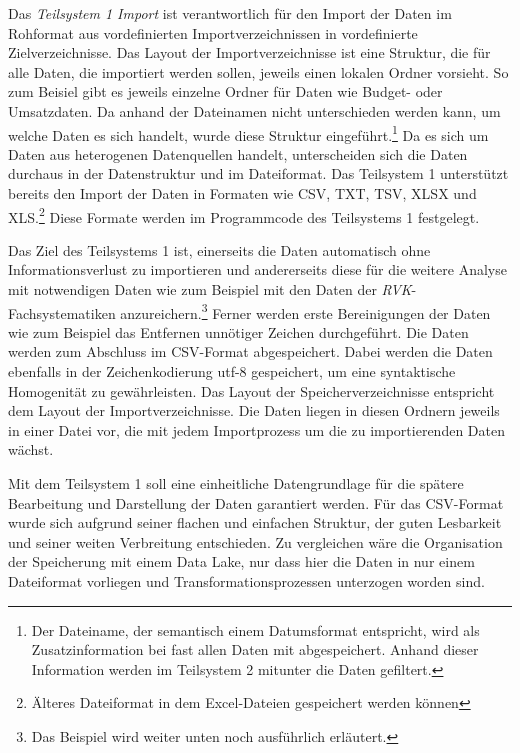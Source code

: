     Das \textit{Teilsystem 1 Import} ist verantwortlich für den Import der Daten im Rohformat aus vordefinierten Importverzeichnissen 
    in vordefinierte Zielverzeichnisse. Das Layout der Importverzeichnisse ist eine Struktur, die für alle Daten, die importiert werden sollen,
    jeweils einen lokalen Ordner vorsieht. So zum Beisiel gibt es jeweils einzelne Ordner für Daten wie Budget- oder Umsatzdaten.
    Da anhand der Dateinamen nicht unterschieden werden kann, um welche Daten es sich handelt, wurde diese Struktur eingeführt.\footnote{ Der Dateiname, der semantisch einem Datumsformat entspricht, wird als Zusatzinformation bei fast allen Daten mit abgespeichert.
    Anhand dieser Information werden im Teilsystem 2 mitunter die Daten gefiltert.} 
    Da es sich um Daten aus heterogenen Datenquellen handelt, unterscheiden sich die Daten durchaus in der Datenstruktur und im Dateiformat. 
    Das Teilsystem 1 unterstützt bereits den Import der Daten in Formaten wie CSV, TXT, TSV, XLSX und XLS.\footnote{ Älteres Dateiformat in dem Excel-Dateien gespeichert werden können} Diese Formate werden im Programmcode des Teilsystems 1 festgelegt.
    
    Das Ziel des Teilsystems 1 ist, einerseits die Daten automatisch ohne Informationsverlust zu importieren 
    und andererseits diese für die weitere Analyse mit notwendigen Daten wie zum Beispiel mit den Daten 
    der \textit{\acrshort{RVK}}-Fachsystematiken anzureichern.\footnote{ Das Beispiel wird weiter unten noch ausführlich erläutert.}
    Ferner werden erste Bereinigungen der Daten wie zum Beispiel das Entfernen unnötiger Zeichen durchgeführt. Die Daten werden zum Abschluss im CSV-Format abgespeichert. 
    Dabei werden die Daten ebenfalls in der Zeichenkodierung utf-8 gespeichert, um eine syntaktische Homogenität zu gewährleisten. Das Layout der Speicherverzeichnisse
    entspricht dem Layout der Importverzeichnisse. Die Daten liegen in diesen Ordnern jeweils in einer Datei vor, die mit jedem Importprozess um die zu importierenden Daten wächst.

    Mit dem Teilsystem 1 soll eine einheitliche Datengrundlage für die spätere Bearbeitung und Darstellung der Daten garantiert werden. Für das CSV-Format wurde sich aufgrund seiner flachen und einfachen Struktur, der guten Lesbarkeit
    und seiner weiten Verbreitung entschieden. Zu vergleichen wäre die Organisation der Speicherung mit einem Data Lake, nur dass hier die Daten in nur einem Dateiformat vorliegen und Transformationsprozessen unterzogen worden sind.
    
